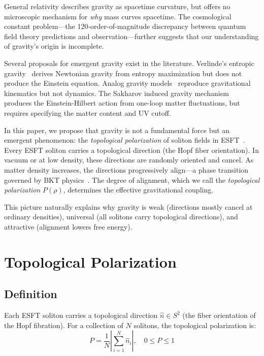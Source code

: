 ﻿\documentclass[twocolumn,preprintnumbers,amsmath,amssymb,prd]{revtex4-2}
\begin{document}
General relativity describes gravity as spacetime curvature, but offers no microscopic mechanism for \emph{why} mass curves spacetime. The cosmological constant problem---the 120-order-of-magnitude discrepancy between quantum field theory predictions and observation---further suggests that our understanding of gravity's origin is incomplete.

Several proposals for emergent gravity exist in the literature. Verlinde's entropic gravity~\cite{Verlinde2011} derives Newtonian gravity from entropy maximization but does not produce the Einstein equation. Analog gravity models~\cite{Barcelo2005} reproduce gravitational kinematics but not dynamics. The Sakharov induced gravity mechanism~\cite{Sakharov1968} produces the Einstein-Hilbert action from one-loop matter fluctuations, but requires specifying the matter content and UV cutoff.

In this paper, we propose that gravity is not a fundamental force but an emergent phenomenon: the \emph{topological polarization} of soliton fields in ESFT~\cite{Paper1,Paper2,Paper3}. Every ESFT soliton carries a topological direction (the Hopf fiber orientation). In vacuum or at low density, these directions are randomly oriented and cancel. As matter density increases, the directions progressively align---a phase transition governed by BKT physics~\cite{Paper4}. The degree of alignment, which we call the \emph{topological polarization} $P(\rho)$, determines the effective gravitational coupling.

This picture naturally explains why gravity is weak (directions mostly cancel at ordinary densities), universal (all solitons carry topological directions), and attractive (alignment lowers free energy).

\section{Topological Polarization}
\label{sec:polarization}

\subsection{Definition}

Each ESFT soliton carries a topological direction $\hat{n} \in S^2$ (the fiber orientation of the Hopf fibration). For a collection of $N$ solitons, the topological polarization is:
\begin{equation}
P = \frac{1}{N}\left|\sum_{i=1}^N \hat{n}_i\right|, \quad 0 \leq P \leq 1
\label{eq:polarization}
\end{equation}
\end{document}
